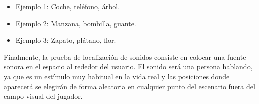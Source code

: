 \begin{itemize}
    \item {Ejemplo 1: Coche, teléfono, árbol.}
    \item {Ejemplo 2: Manzana, bombilla, guante.}
    \item {Ejemplo 3: Zapato, plátano, flor.}
\end{itemize}

Finalmente, la prueba de localización de sonidos consiste en colocar una fuente sonora en el espacio al rededor del usuario. El sonido será una persona hablando, ya que es un estímulo muy habitual en la vida real y las posiciones donde aparecerá se elegirán de forma aleatoria en cualquier punto del escenario fuera del campo visual del jugador.

